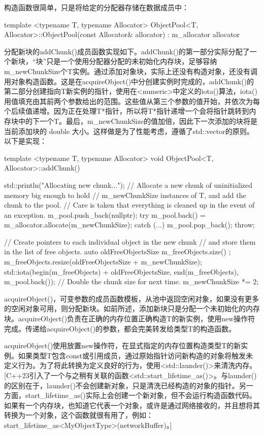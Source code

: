 构造函数很简单，只是将给定的分配器存储在数据成员中：

\begin{cpp}
template <typename T, typename Allocator>
ObjectPool<T, Allocator>::ObjectPool(const Allocator& allocator)
    : m_allocator { allocator }
{}
\end{cpp}

分配新块的addChunk()成员函数实现如下。addChunk()的第一部分实际分配了一个新块，“块”只是一个使用分配器分配的未初始化内存块，足够容纳m\_newChunkSize个T实例。通过添加对象块，实际上还没有构造对象，还没有调用对象构造函数。这是在acquireObject()中分创建实例时完成的，addChunk()的第二部分创建指向T新实例的指针，使用在<numeric>中定义的iota()算法，iota()用值填充由其前两个参数给出的范围。这些值从第三个参数的值开始，并依次为每个后续值递增。因为正在处理T*指针，所以将T*指针递增一个会将指针跳转到内存块中的下一个T。最后，m\_newChunkSize的值加倍，因此下一次添加的块将是当前添加块的 double 大小。这样做是为了性能考虑，遵循了std::vector的原则。以下是实现：

\begin{cpp}
template <typename T, typename Allocator>
void ObjectPool<T, Allocator>::addChunk()
{
    std::println("Allocating new chunk...");
    // Allocate a new chunk of uninitialized memory big enough to hold
    // m_newChunkSize instances of T, and add the chunk to the pool.
    // Care is taken that everything is cleaned up in the event of an exception.
    m_pool.push_back(nullptr);
    try {
        m_pool.back() = m_allocator.allocate(m_newChunkSize);
    } catch (...) {
        m_pool.pop_back();
        throw;
    }

    // Create pointers to each individual object in the new chunk
    // and store them in the list of free objects.
    auto oldFreeObjectsSize { m_freeObjects.size() };
    m_freeObjects.resize(oldFreeObjectsSize + m_newChunkSize);
    std::iota(begin(m_freeObjects) + oldFreeObjectsSize, end(m_freeObjects),
        m_pool.back());
    // Double the chunk size for next time.
    m_newChunkSize *= 2;
}
\end{cpp}

acquireObject()，可变参数的成员函数模板，从池中返回空闲对象，如果没有更多的空闲对象可用，则分配新块。如前所述，添加新块只是分配一个未初始化的内存块。acquireObject()负责在正确的内存位置正确构造T的新实例，使用new操作符完成。传递给acquireObject()的参数，都会完美转发给类型T的构造函数。

acquireObject()使用放置new操作符，在显式指定的内存位置构造类型T的新实例。如果类型T包含const或引用成员，通过原始指针访问新构造的对象将触发未定义行为。为了将此转换为定义良好的行为，使用<std::launder()>来清洗内存。[C++23引入了一个与之稍有关联的函数<std::start\_lifetime\_as()>。与launder()的区别在于，launder()不会创建新对象，只是清洗已经构造的对象的指针。另一方面，start\_lifetime\_as()实际上会创建一个新对象，但不会运行构造函数代码。如果有一个内存块，也知道它代表一个对象，或许是通过网络接收的，并且想将其转换为一个对象，这个函数就很有用了，例如：start\_lifetime\_as<MyObjectType>(networkBuffer)。]

